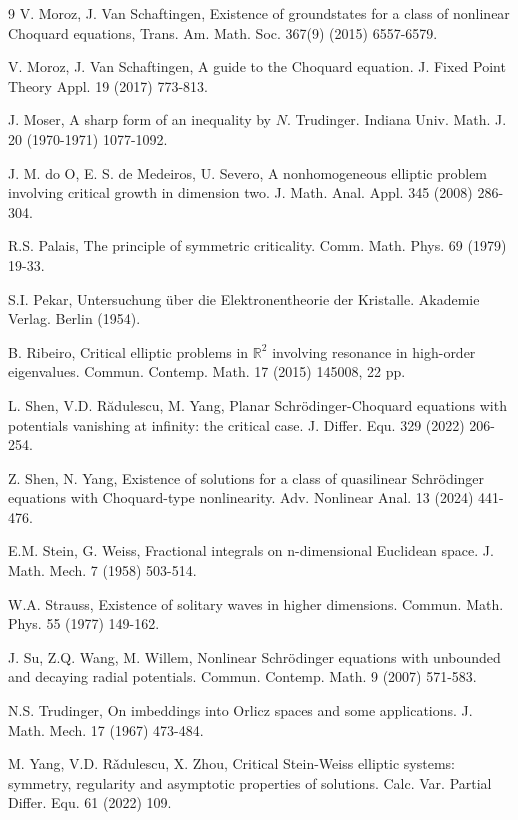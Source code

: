 \documentclass[11pt]{amsart}
\numberwithin{equation}{section}
\newcommand{\R}{\mathbb{R}}
\newcommand{\1}{\frac{1}{2}}
\begin{document}
\begin{thebibliography}{9}
		 V. Moroz, J. Van Schaftingen, Existence of groundstates for a class of nonlinear Choquard equations, Trans. Am. Math. Soc. 367(9) (2015) 6557-6579.
		
		 V. Moroz, J. Van Schaftingen, A guide to the Choquard equation. J. Fixed Point Theory Appl. 19 (2017) 773-813.
		
		 J. Moser, A sharp form of an inequality by $N$. Trudinger. Indiana Univ. Math. J. 20 (1970-1971) 1077-1092.
		
		 J. M. do O, E. S. de Medeiros, U. Severo, A nonhomogeneous elliptic problem involving
		critical growth in dimension two. J. Math. Anal. Appl. 345 (2008) 286-304.
		
		 R.S. Palais, The principle of symmetric criticality. Comm. Math. Phys. 69 (1979) 19-33.
		
		 S.I. Pekar, Untersuchung \"{u}ber die Elektronentheorie der Kristalle. Akademie Verlag.
		Berlin (1954).
		
		 B. Ribeiro, Critical elliptic problems in $\R^2$ involving resonance in high-order eigenvalues. Commun. Contemp. Math. 17 (2015) 145008, 22 pp.
		
		 L. Shen, V.D. R\u adulescu, M. Yang, Planar Schr\"odinger-Choquard equations with potentials vanishing at infinity: the critical case. J. Differ. Equ. 329 (2022) 206-254.
		
		 Z. Shen, N. Yang, Existence of solutions for a class of quasilinear Schrödinger equations with Choquard-type nonlinearity. Adv. Nonlinear Anal. 13 (2024)  441-476.
		
		 E.M. Stein, G. Weiss, Fractional integrals on n-dimensional Euclidean space. J. Math. Mech. 7 (1958) 503-514. 
		
		 W.A. Strauss, Existence of solitary waves in higher dimensions. Commun. Math. Phys. 55 (1977) 149-162.
		
		 J. Su, Z.Q. Wang, M. Willem, Nonlinear Schr\"{o}dinger equations with unbounded and decaying radial potentials. Commun. Contemp. Math. 9 (2007) 571-583.  
		
		 N.S. Trudinger, On imbeddings into Orlicz spaces and some applications. J. Math. Mech. 17 (1967) 473-484.
		
		 M. Yang, V.D. R\v{a}dulescu, X. Zhou, Critical Stein-Weiss elliptic systems: symmetry, regularity and asymptotic properties of solutions. Calc. Var. Partial Differ. Equ. 61 (2022) 109.
		
	\end{thebibliography}
\end{document}

